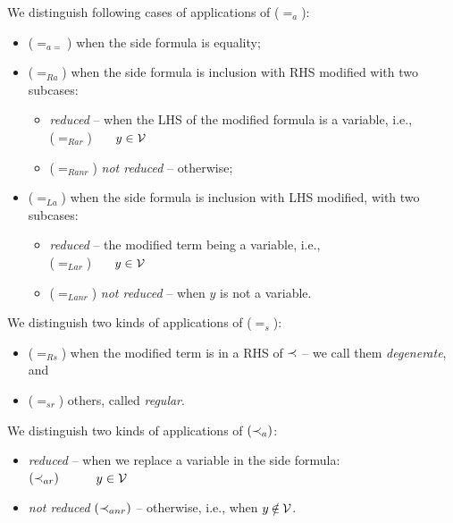 \begin{DEFINITION}\label{de:eqALR}\label{de:eqSD}\label{de:inclad}\label{de:anr}
We distinguish following cases of applications of ($=_a$):
\begin{itemize}\MyLPar
\item ($=_{a=}$) when the side formula is equality;
\item ($=_{Ra}$) when the side formula is inclusion with RHS modified with
two subcases:
\begin{itemize}\MyLPar
\item {\em reduced} -- when the LHS of the modified formula is a
variable, i.e., \\
 ($=_{Rar}$)\ \  \ $y\in{\cal V}$
\item ($=_{Ranr}$) {\em not reduced} -- otherwise;
\end{itemize}
\item ($=_{La}$) when the side formula is inclusion with LHS modified, with
two subcases:
\begin{itemize}\MyLPar
\item {\em reduced} -- the modified term being a variable, i.e., \\
  ($=_{Lar}$) \ \ \ $y\in{\cal V}$
\item ($=_{Lanr}$) {\em not reduced} -- when $y$ is not a variable.
\end{itemize}
\end{itemize}
We distinguish two kinds of applications of ($=_s$):
\begin{itemize}\MyLPar
\item ($=_{Rs}$)  when the modified term is in a RHS of $\mathbin{\prec}$ -- we call
them {\em degenerate}, and
\item ($=_{sr}$) others, called {\em regular}.
\end{itemize}
We distinguish two kinds of applications of $(\mathbin{\prec}_a)$:
\begin{itemize}\MyLPar
\item  {\em reduced} -- when we replace a variable in the side formula:\\
 $(\mathbin{\prec}_{ar})$\ \ 
\label{ru:ar}\ \ \  $y\in {\cal V}$
\item {\em not reduced} $(\mathbin{\prec}_{anr})$ -- otherwise, i.e.,  when
$y\not\in\Vars$. 
\end{itemize}
\end{DEFINITION}

